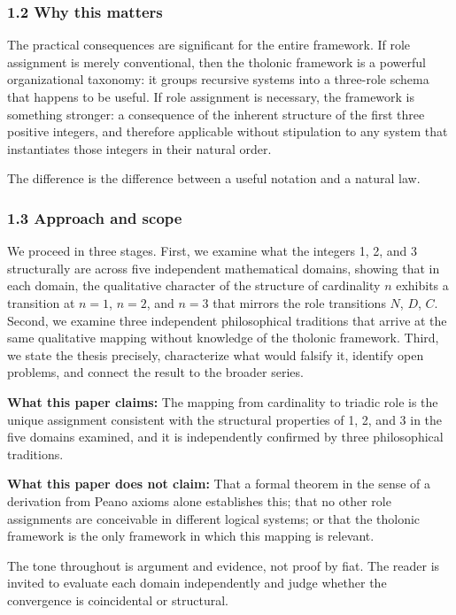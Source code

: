 \documentclass[
  11pt,
  letterpaper,
]{article}
\begin{document}
\subsubsection{1.2 Why this matters}\label{why-this-matters}

The practical consequences are significant for the entire framework. If
role assignment is merely conventional, then the tholonic framework is a
powerful organizational taxonomy: it groups recursive systems into a
three-role schema that happens to be useful. If role assignment is
necessary, the framework is something stronger: a consequence of the
inherent structure of the first three positive integers, and therefore
applicable without stipulation to any system that instantiates those
integers in their natural order.

The difference is the difference between a useful notation and a natural
law.

\subsubsection{1.3 Approach and scope}\label{approach-and-scope}

We proceed in three stages. First, we examine what the integers 1, 2,
and 3 structurally are across five independent mathematical domains,
showing that in each domain, the qualitative character of the structure
of cardinality \(n\) exhibits a transition at \(n = 1\), \(n = 2\), and
\(n = 3\) that mirrors the role transitions \(N\), \(D\), \(C\). Second,
we examine three independent philosophical traditions that arrive at the
same qualitative mapping without knowledge of the tholonic framework.
Third, we state the thesis precisely, characterize what would falsify
it, identify open problems, and connect the result to the broader
series.

\textbf{What this paper claims:} The mapping from cardinality to triadic
role is the unique assignment consistent with the structural properties
of 1, 2, and 3 in the five domains examined, and it is independently
confirmed by three philosophical traditions.

\textbf{What this paper does not claim:} That a formal theorem in the
sense of a derivation from Peano axioms alone establishes this; that no
other role assignments are conceivable in different logical systems; or
that the tholonic framework is the only framework in which this mapping
is relevant.

The tone throughout is argument and evidence, not proof by fiat. The
reader is invited to evaluate each domain independently and judge
whether the convergence is coincidental or structural.
\end{document}

